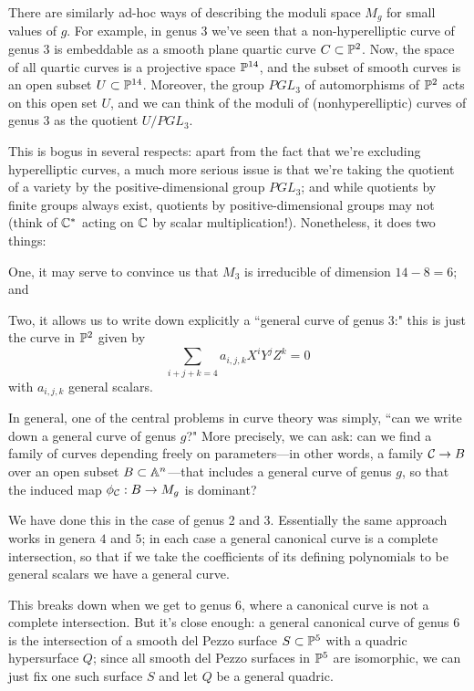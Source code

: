 There are similarly ad-hoc ways of describing the moduli space $M_g$ for small values of $g$. For example, in genus 3 we've seen that a non-hyperelliptic curve of genus 3 is embeddable as a smooth plane quartic curve $C \subset \PP^2$. Now, the space of all quartic curves is a projective space $\PP^{14}$, and the subset of smooth curves is an open subset $U \subset \PP^{14}$. Moreover, the group $PGL_3$ of automorphisms of $\PP^2$ acts on this open set $U$, and we can think of the moduli of (nonhyperelliptic) curves of genus 3 as the quotient $U/PGL_3$.

This is bogus in several respects: apart from the fact that we're excluding hyperelliptic curves, a much more serious issue is that we're taking the quotient of a variety by the positive-dimensional group $PGL_3$; and while quotients by finite groups always exist, quotients by positive-dimensional groups may not (think of $\CC^*$ acting on $\CC$ by scalar multiplication!). Nonetheless, it does two things:


One, it may serve to convince us that $M_3$ is irreducible of dimension $14-8 = 6$; and

Two, it allows us to write down explicitly a ``general curve of genus 3:" this is just the curve in $\PP^2$ given by
$$
\sum_{i+j+k = 4} a_{i,j,k} X^iY^jZ^k = 0
$$
with $a_{i,j,k}$ general scalars.

In general,  one of the central problems in curve theory was simply, ``can we write down a general curve of genus $g$?" More precisely, we can ask: can we find a family of curves depending freely on parameters---in other words, a family $\cC \to B$ over an open subset $B \subset \AA^n$---that includes a general curve of genus $g$, so that the induced map $\phi_\cC : B \to M_g$ is dominant? 

We have done this in the case of genus 2 and 3. Essentially
the same approach works in genera $4$ and $5$; in each case a general canonical curve is a complete intersection, so that if we take the coefficients of its defining polynomials to be general scalars we have a general curve.

This breaks down when we get to genus 6, where a canonical curve is not a complete intersection. But it's close enough: a general canonical curve of genus 6 is the intersection of a smooth del Pezzo surface $S \subset \PP^5$ with a quadric hypersurface $Q$; since all smooth del Pezzo surfaces in $\PP^5$ are isomorphic, we can just fix one such surface $S$ and let $Q$ be a general quadric.


